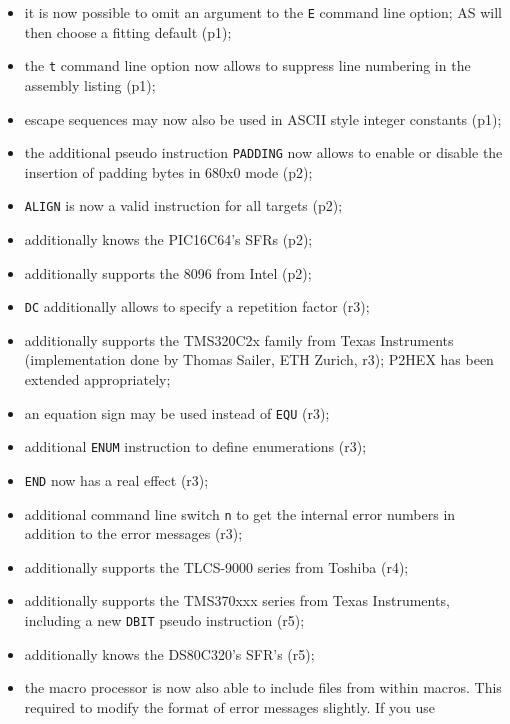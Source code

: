 \documentclass[12pt,twoside]{report}
\newcommand{\tty}[1]{{\tt #1}}
\begin{document}
\begin{itemize}
{\begin{itemize}
{            print a list of constructs that forced additional
            passes (p1);}
      \item{it is now possible to omit an argument to the \tty{E}
            command line option; AS will then choose a fitting
            default (p1);}
      \item{the \tty{t} command line option now allows to suppress
            line numbering in the assembly listing (p1);}
      \item{escape sequences may now also be used in ASCII style
            integer constants (p1);}
      \item{the additional pseudo instruction \tty{PADDING} now allows
            to enable or disable the insertion of padding bytes
            in 680x0 mode (p2);}
      \item{\tty{ALIGN} is now a valid instruction for all targets
            (p2);}
      \item{additionally knows the PIC16C64's SFRs (p2);}
      \item{additionally supports the 8096 from Intel (p2);}
      \item{\tty{DC} additionally allows to specify a repetition factor
            (r3);}
      \item{additionally supports the TMS320C2x family from Texas
            Instruments (implementation done by Thomas Sailer, ETH
            Zurich, r3); P2HEX has been extended appropriately;}
      \item{an equation sign may be used instead of \tty{EQU} (r3);}
      \item{additional \tty{ENUM} instruction to define enumerations
            (r3);}
      \item{\tty{END} now has a real effect (r3);}
      \item{additional command line switch \tty{n} to get the internal
            error numbers in addition to the error messages (r3);}
      \item{additionally supports the TLCS-9000 series from
            Toshiba (r4);}
      \item{additionally supports the TMS370xxx series from Texas
            Instruments, including a new \tty{DBIT} pseudo instruction
            (r5);}
      \item{additionally knows the DS80C320's SFR's (r5);}
      \item{the macro processor is now also able to include files
            from within macros.  This required to modify the
            format of error messages slightly.  If you use
}
\end{itemize}}
\end{itemize}
\end{document}
